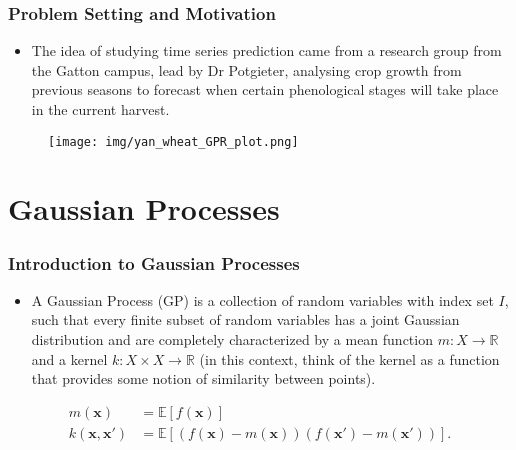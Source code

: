 \documentclass[9pt,hyperref={pdfpagelabels=false},xcolor=table]{beamer}
\begin{document}
\begin{frame}
    \frametitle{Problem Setting and Motivation}
    \begin{itemize}
        \item The idea of studying time series prediction came from a research group from the Gatton campus, lead by Dr Potgieter, analysing crop growth from previous seasons to forecast when certain phenological stages will take place in the current harvest.
    \end{itemize}
    \begin{figure}
        \centering
        \texttt{[image: img/yan\_wheat\_GPR\_plot.png]}
    \end{figure}
\end{frame}

\section{Gaussian Processes}

\begin{frame}
    \frametitle{Introduction to Gaussian Processes}
    \begin{itemize}
        \item A Gaussian Process (GP) is a collection of random variables with index set $I$, such that every finite subset of random variables has a joint Gaussian distribution and are completely characterized by a mean function $m : X \to \mathbb{R}$ and a kernel $k : X \times X \to \mathbb{R}$ (in this context, think of the kernel as a function that provides some notion of similarity between points).
    \end{itemize}
    \begin{align*}
        m(\bm{x})           & = \mathbb{E} \left[ f(\bm{x}) \right]                                          \\
        k (\bm{x}, \bm{x'}) & = \mathbb{E} \left[ (f(\bm{x}) - m(\bm{x})) (f(\bm{x'}) - m(\bm{x'})) \right].
    \end{align*}
\end{frame}
\end{document}
